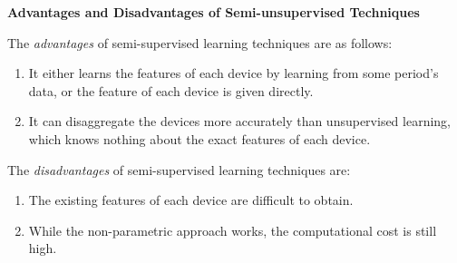 \textbf{Advantages and Disadvantages of Semi-unsupervised Techniques}

The \textit{advantages} of semi-supervised learning techniques are as follows:
\begin{enumerate}
\item It either learns the features of each device by learning from some period's data, or the feature of each device is given directly. 
\item It can disaggregate the devices more accurately than unsupervised learning, 
which knows nothing about the exact features of each device. 
\end{enumerate}


The \textit{disadvantages} of semi-supervised learning techniques are:
\begin{enumerate}
\item The existing features of each device are difficult to obtain. 
\item While the non-parametric approach works, the computational cost is still high.
\end{enumerate}



%
%
%


